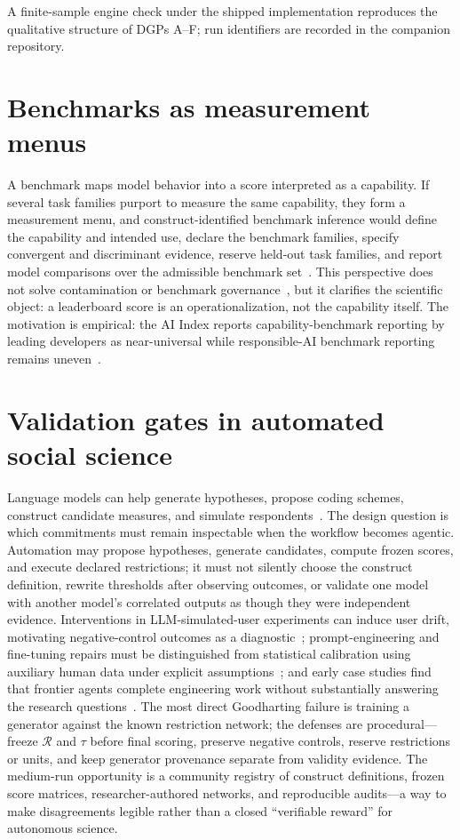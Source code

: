 \documentclass[10pt,letterpaper]{article}
\newcommand{\Rset}{\mathcal{R}}
\begin{document}
A finite-sample engine check under the shipped implementation reproduces the qualitative structure of DGPs A--F; run identifiers are recorded in the companion repository.

\section{Benchmarks as measurement menus}
\label{app:bench}

A benchmark maps model behavior into a score interpreted as a capability.
If several task families purport to measure the same capability, they form a measurement menu, and construct-identified benchmark inference would define the capability and intended use, declare the benchmark families, specify convergent and discriminant evidence, reserve held-out task families, and report model comparisons over the admissible benchmark set~\cite{wallach2025,bean2025}.
This perspective does not solve contamination or benchmark governance~\cite{truong2026}, but it clarifies the scientific object: a leaderboard score is an operationalization, not the capability itself.
The motivation is empirical: the AI Index reports capability-benchmark reporting by leading developers as near-universal while responsible-AI benchmark reporting remains uneven~\cite{hai2026}.

\section{Validation gates in automated social science}
\label{app:automation}

Language models can help generate hypotheses, propose coding schemes, construct candidate measures, and simulate respondents~\cite{manning2024}.
The design question is which commitments must remain inspectable when the workflow becomes agentic.
Automation may propose hypotheses, generate candidates, compute frozen scores, and execute declared restrictions; it must not silently choose the construct definition, rewrite thresholds after observing outcomes, or validate one model with another model's correlated outputs as though they were independent evidence.
Interventions in LLM-simulated-user experiments can induce user drift, motivating negative-control outcomes as a diagnostic~\cite{illusion2026}; prompt-engineering and fine-tuning repairs must be distinguished from statistical calibration using auxiliary human data under explicit assumptions~\cite{hullman2026}; and early case studies find that frontier agents complete engineering work without substantially answering the research questions~\cite{kirgis2026}.
The most direct Goodharting failure is training a generator against the known restriction network; the defenses are procedural---freeze $\Rset$ and $\tau$ before final scoring, preserve negative controls, reserve restrictions or units, and keep generator provenance separate from validity evidence.
The medium-run opportunity is a community registry of construct definitions, frozen score matrices, researcher-authored networks, and reproducible audits---a way to make disagreements legible rather than a closed ``verifiable reward'' for autonomous science.
\end{document}
